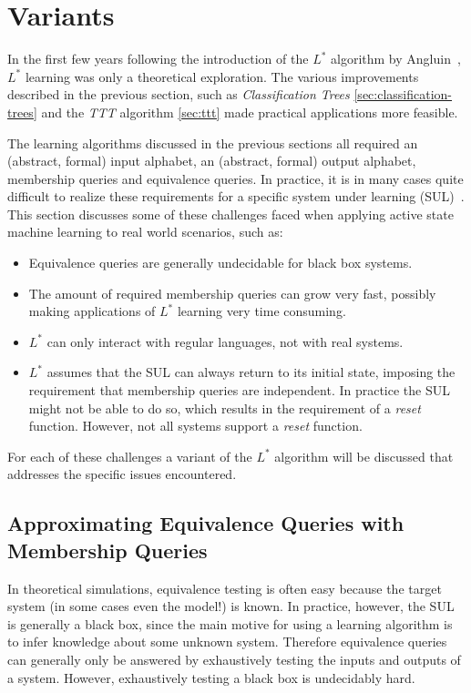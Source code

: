 \section{Variants}
\label{sec:variants}
In the first few years following the introduction of the $L^*$ algorithm by
Angluin~\cite{Angluin1987}, $L^*$ learning was only a theoretical exploration.
The various improvements described in the previous section,
such as \textit{Classification Trees} \cref{sec:classification-trees} and
the \textit{TTT} algorithm \cref{sec:ttt} made practical applications more feasible.

The learning algorithms discussed in the previous sections all required an
(abstract, formal) input alphabet, an (abstract, formal) output alphabet,
membership queries and equivalence queries.
In practice, it is in many cases quite difficult to realize these requirements
for a specific system under learning (SUL)~\cite{Steffen2011a}.
This section discusses some of these challenges faced when
applying active state machine learning to real world scenarios, such as:
\begin{itemize}
  \item Equivalence queries are generally undecidable for black box systems.
  \item The amount of required membership queries can grow very fast,
        possibly making applications of $L^*$ learning very time consuming.
  \item $L^*$ can only interact with regular languages, not with real systems.
  \item $L^*$ assumes that the SUL can always return to its initial state,
        imposing the requirement that membership queries are independent.
        In practice the SUL might not be able to do so,
        which results in the requirement of a \textit{reset} function.
        However, not all systems support a \textit{reset} function.
\end{itemize}
For each of these challenges a variant of the $L^*$ algorithm will be discussed
that addresses the specific issues encountered.

\subsection{Approximating Equivalence Queries with Membership Queries}
In theoretical simulations, equivalence testing is often easy because the target
system (in some cases even the model!) is known. In practice, however, the SUL
is generally a black box, since the main motive for using a learning algorithm
is to infer knowledge about some unknown system. Therefore equivalence queries
can generally only be answered by exhaustively testing the inputs and outputs of
a system. However, exhaustively testing a black box is undecidably hard.

